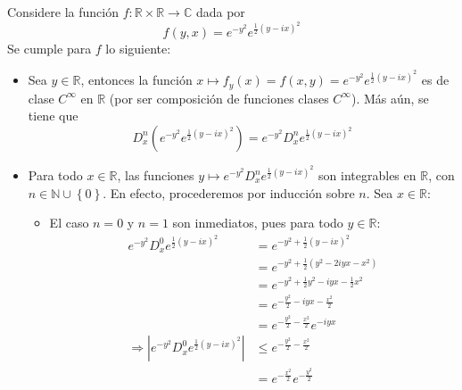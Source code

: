 \documentclass[12pt]{report}
\newcounter{it}
\theoremstyle{largebreak}
\renewcommand{\leq}{\ensuremath{\leqslant}}
\newcommand\abs[1]{\ensuremath{\left|#1\right|}}
\newcommand\cf[3]{\ensuremath{#1:#2\rightarrow#3}}
\begin{document}
    \begin{sol}
        Considere la función $\cf{f}{\mathbb{R}\times\mathbb{R}}{\mathbb{C}}$ dada por
        \begin{equation*}
            f(y,x)=e^{-y^2}e^{\frac{1}{2}\left(y-ix \right)^2}
        \end{equation*}
        Se cumple para $f$ lo siguiente:
        \begin{itemize}
            \item Sea $y\in\mathbb{R}$, entonces la función $x\mapsto f_y(x)=f(x,y)=e^{-y^2}e^{\frac{1}{2}\left(y-ix \right)^2}$ es de clase $C^{\infty}$ en $\mathbb{R}$ (por ser composición de funciones clases $C^{\infty}$). Más aún, se tiene que
            \begin{equation*}
                D_x^n\left(e^{-y^2}e^{\frac{1}{2}\left(y-ix \right)^2}\right)=e^{ -y^2}D_x^ne^{\frac{1}{2}\left(y-ix \right)^2}
            \end{equation*}
            \item Para todo $x\in\mathbb{R}$, las funciones $y\mapsto e^{ -y^2}D_x^ne^{\frac{1}{2}\left(y-ix \right)^2}$ son integrables en $\mathbb{R}$, con $n\in\mathbb{N}\cup\left\{0\right\}$. En efecto, procederemos por inducción sobre $n$. Sea $x\in\mathbb{R}$:
            \begin{itemize}
                \item El caso $n=0$ y $n=1$ son inmediatos, pues para todo $y\in\mathbb{R}$:
                \begin{equation*}
                    \begin{split}
                        e^{ -y^2}D_x^0e^{\frac{1}{2}\left(y-ix \right)^2}&=e^{-y^2+\frac{1}{2}\left(y-ix \right)^2}\\
                        &=e^{-y^2 +\frac{1}{2}(y^2-2iyx-x^2)}\\
                        &=e^{-y^2+\frac{1}{2}y^2-iyx-\frac{1}{2}x^2}\\
                        &=e^{-\frac{y^2}{2}-iyx-\frac{x^2}{2}}\\
                        &=e^{-\frac{y^2}{2}-\frac{x^2}{2}}e^{-iyx}\\
                        \Rightarrow \abs{e^{ -y^2}D_x^0e^{\frac{1}{2}\left(y-ix \right)^2}}&\leq e^{-\frac{y^2}{2}-\frac{x^2}{2}}\\
                        &=e^{-\frac{x^2}{2}}e^{-\frac{y^2}{2}}\\
                    \end{split}
                \end{equation*}

\end{itemize}
\end{itemize}
\end{sol}
\end{document}
